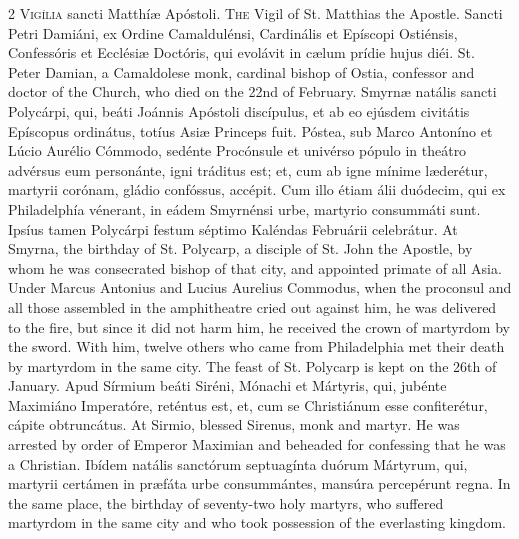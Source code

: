 \begin{paracol}{2}
\lettrine[lines=1]{V}{igília} sancti Matthíæ Apóstoli.
\switchcolumn
{}
\lettrine[lines=1]{T}{he} Vigil of St. Matthias the Apostle.
\switchcolumn*
{}
Sancti Petri Damiáni, ex Ordine Camaldulénsi, Cardinális et Epíscopi 
 Ostiénsis, Confessóris et Ecclésiæ Doctóris, 
 qui evolávit in cælum prídie hujus diéi.
\switchcolumn
{}
St. Peter Damian, a Camaldolese monk, cardinal bishop of Ostia, confessor 
 and doctor of the Church, who died on the 22nd of February.
\switchcolumn*
{}
Smyrnæ natális sancti Polycárpi, qui, beáti 
 Joánnis Apóstoli discípulus, et ab eo ejúsdem civitátis Epíscopus ordinátus, 
 totíus Asiæ Princeps fuit. Póstea, sub Marco Antoníno et Lúcio Aurélio 
 Cómmodo, sedénte Procónsule et univérso pópulo in theátro advérsus eum 
 personánte, igni tráditus est; et, cum ab igne mínime læderétur, martyrii 
 corónam, gládio confóssus, accépit. Cum illo étiam álii duódecim, qui 
 ex Philadelphía vénerant, in eádem Smyrnénsi urbe, martyrio consummáti sunt. 
 Ipsíus tamen Polycárpi festum séptimo Kaléndas Februárii celebrátur.
\switchcolumn
{}
At Smyrna, the birthday of St. Polycarp, a disciple of St. John the Apostle, 
 by whom he was consecrated bishop of that city, and appointed primate of all 
 Asia. Under Marcus Antonius and Lucius Aurelius Commodus, when the 
 proconsul and all those assembled in the amphitheatre cried out against him, 
 he was delivered to the fire, but since it did not harm him, he received the 
 crown of martyrdom by the sword. With him, twelve others who came from 
 Philadelphia met their death by martyrdom in the same city. The feast 
 of St. Polycarp is kept on the 26th of January.
\switchcolumn*
{}
Apud Sírmium beáti Siréni, Mónachi et Mártyris, qui, jubénte Maximiáno 
 Imperatóre, reténtus est, et, cum se Christiánum esse confiterétur, cápite 
 obtruncátus.
\switchcolumn
{}
At Sirmio, blessed Sirenus, monk and martyr. He was arrested by order 
 of Emperor Maximian and beheaded for confessing that he was a Christian.
\switchcolumn*
{}
Ibídem natális sanctórum septuagínta duórum Mártyrum, qui, martyrii certámen 
 in præfáta urbe consummántes, mansúra 
 percepérunt regna.
\switchcolumn
{}
In the same place, the birthday of seventy-two holy martyrs, who suffered 
 martyrdom in the same city and who took possession of the everlasting 
 kingdom.
\switchcolumn*

\end{paracol}
